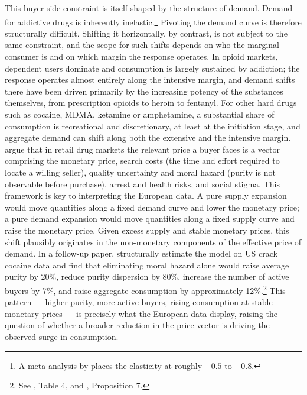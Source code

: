 \documentclass[12pt, a4paper]{article}
\begin{document}
This buyer-side constraint is itself shaped by the structure of demand. Demand for addictive drugs is inherently inelastic.\footnote{A meta-analysis by \citet{gallet_2014} places the elasticity at roughly $-0.5$ to $-0.8$.} Pivoting the demand curve is therefore structurally difficult. Shifting it horizontally, by contrast, is not subject to the same constraint, and the scope for such shifts depends on who the marginal consumer is and on which margin the response operates. In opioid markets, dependent users dominate and consumption is largely sustained by addiction; the response operates almost entirely along the intensive margin, and demand shifts there have been driven primarily by the increasing potency of the substances themselves, from prescription opioids to heroin to fentanyl. For other hard drugs such as cocaine, MDMA, ketamine or amphetamine, a substantial share of consumption is recreational and discretionary, at least at the initiation stage, and aggregate demand can shift along both the extensive and the intensive margin. \citet{galenianos_2012} argue that in retail drug markets the relevant price a buyer faces is a vector comprising the monetary price, search costs (the time and effort required to locate a willing seller), quality uncertainty and moral hazard (purity is not observable before purchase), arrest and health risks, and social stigma. This framework is key to interpreting the European data. A pure supply expansion would move quantities along a fixed demand curve and lower the monetary price; a pure demand expansion would move quantities along a fixed supply curve and raise the monetary price. Given excess supply and stable monetary prices, this shift plausibly originates in the non-monetary components of the effective price of demand. In a follow-up paper, \citet{galenianos_2017} structurally estimate the model on US crack cocaine data and find that eliminating moral hazard alone would raise average purity by 20\%, reduce purity dispersion by 80\%, increase the number of active buyers by 7\%, and raise aggregate consumption by approximately 12\%.\footnote{See \citet{galenianos_2017}, Table 4, and \citet{galenianos_2012}, Proposition 7.} This pattern --- higher purity, more active buyers, rising consumption at stable monetary prices --- is precisely what the European data display, raising the question of whether a broader reduction in the price vector is driving the observed surge in consumption.
\end{document}
